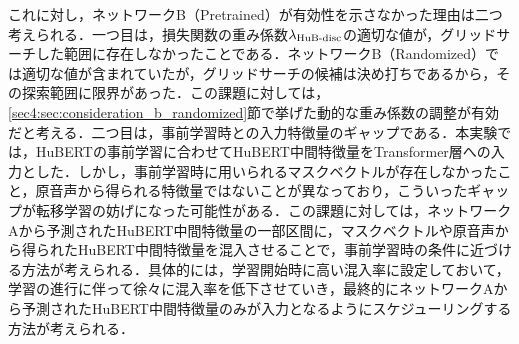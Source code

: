 これに対し，ネットワークB（Pretrained）が有効性を示さなかった理由は二つ考えられる．一つ目は，損失関数の重み係数$\lambda_{\text{HuB-disc}}$の適切な値が，グリッドサーチした範囲に存在しなかったことである．ネットワークB（Randomized）では適切な値が含まれていたが，グリッドサーチの候補は決め打ちであるから，その探索範囲に限界があった．この課題に対しては，\ref{sec4:sec:consideration_b_randomized}節で挙げた動的な重み係数の調整が有効だと考える．二つ目は，事前学習時との入力特徴量のギャップである．本実験では，HuBERTの事前学習に合わせてHuBERT中間特徴量をTransformer層への入力とした．しかし，事前学習時に用いられるマスクベクトルが存在しなかったこと，原音声から得られる特徴量ではないことが異なっており，こういったギャップが転移学習の妨げになった可能性がある．この課題に対しては，ネットワークAから予測されたHuBERT中間特徴量の一部区間に，マスクベクトルや原音声から得られたHuBERT中間特徴量を混入させることで，事前学習時の条件に近づける方法が考えられる．具体的には，学習開始時に高い混入率に設定しておいて，学習の進行に伴って徐々に混入率を低下させていき，最終的にネットワークAから予測されたHuBERT中間特徴量のみが入力となるようにスケジューリングする方法が考えられる．
